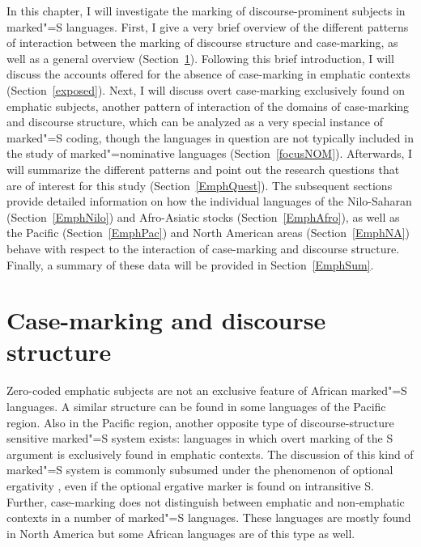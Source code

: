 In this chapter, I will investigate the marking of discourse-prominent subjects in marked"=S languages. 
First, I give a very brief overview of the different patterns of interaction between the marking of discourse structure and case-marking, as well as a general overview (Section~\ref{discourse}).
Following this brief introduction, I will discuss the accounts offered for the absence of case-marking in emphatic contexts (Section~\ref{exposed}). 
Next, I will discuss overt case-marking exclusively found on emphatic subjects, another pattern of interaction of the domains of case-marking and discourse structure, which can be analyzed as a very special instance of marked"=S coding, though the languages in question are not typically included in the study of marked"=nominative languages (Section~\ref{focusNOM}).
Afterwards, I will summarize the different patterns and point out the research questions that are of interest for this study (Section~\ref{EmphQuest}). 
The subsequent sections provide detailed information on how the individual languages of the Nilo-Saharan (Section~\ref{EmphNilo}) and Afro-Asiatic  stocks (Section~\ref{EmphAfro}), as well as the Pacific (Section~\ref{EmphPac}) and North American areas (Section~\ref{EmphNA}) behave with respect to the interaction of case-marking and discourse structure. 
Finally, a summary of these data will be provided in Section~\ref{EmphSum}.



\section{Case-marking and discourse structure}\label{discourse}

Zero-coded emphatic subjects are not an exclusive feature of African marked"=S languages. 
A similar structure can be found in some languages of the Pacific region. 
Also in the Pacific region, another opposite type of discourse-structure sensitive marked"=S system exists: languages in which overt marking of the S argument is exclusively found in emphatic contexts. 
The discussion of this kind of marked"=S system is commonly subsumed under the phenomenon of optional ergativity \citep{OptionalErg}, even if the optional ergative marker is found on intransitive S.
Further, case-marking does not distinguish between emphatic and non-emphatic contexts in a number of marked"=S languages. 
These languages are mostly found in North America but some African languages are of this type as well.

